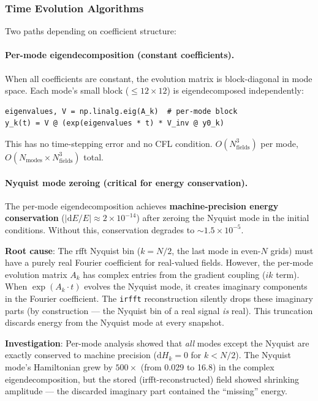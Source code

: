 \subsubsection{Time Evolution Algorithms}
\label{sec:modal-time-evolution}

Two paths depending on coefficient structure:

\paragraph{Per-mode eigendecomposition (constant coefficients).}
\label{par:modal-eigendecomp}
When all coefficients are constant, the evolution matrix is block-diagonal in mode space. Each mode's small block ($\leq 12\times 12$) is eigendecomposed independently:
\begin{lstlisting}[style=python]
eigenvalues, V = np.linalg.eig(A_k)  # per-mode block
y_k(t) = V @ (exp(eigenvalues * t) * V_inv @ y0_k)
\end{lstlisting}

This has no time-stepping error and no CFL condition. $O(N_\text{fields}^3)$ per mode, $O(N_\text{modes} \times N_\text{fields}^3)$ total.

\paragraph{Nyquist mode zeroing (critical for energy conservation).}
\label{par:modal-nyquist}
The per-mode eigendecomposition achieves \textbf{machine-precision energy conservation} ($|\mathrm{d}E/E| \approx 2\times 10^{-14}$) after zeroing the Nyquist mode in the initial conditions. Without this, conservation degrades to ${\sim}1.5\times 10^{-5}$.

\textbf{Root cause}: The rfft Nyquist bin ($k = N/2$, the last mode in even-$N$ grids) must have a purely real Fourier coefficient for real-valued fields. However, the per-mode evolution matrix $A_k$ has complex entries from the gradient coupling ($ik$ term). When $\exp(A_k \cdot t)$ evolves the Nyquist mode, it creates imaginary components in the Fourier coefficient. The \texttt{irfft} reconstruction silently drops these imaginary parts (by construction --- the Nyquist bin of a real signal \emph{is} real). This truncation discards energy from the Nyquist mode at every snapshot.

\textbf{Investigation}: Per-mode analysis showed that \emph{all} modes except the Nyquist are exactly conserved to machine precision ($\mathrm{d}H_k = 0$ for $k < N/2$). The Nyquist mode's Hamiltonian grew by $500\times$ (from 0.029 to 16.8) in the complex eigendecomposition, but the stored (irfft-reconstructed) field showed shrinking amplitude --- the discarded imaginary part contained the ``missing'' energy.

